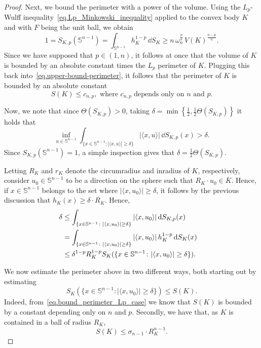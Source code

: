 \documentclass[a4paper, 10pt, twoside]{amsart}
\numberwithin{equation}{section}
\theoremstyle{plain}
\theoremstyle{definition}
\begin{document}
\begin{proof}
Next, we bound the perimeter with a power of the volume. Using the $L_p$-Wulff inequality~\eqref{eq.Lp_Minkowski_inequality} applied to the convex body $K$ and with $F$ being the unit ball, we obtain
\[
    1
    = 
    S_{K,p}(\mathbb{S}^{n-1}) 
    = 
    \int_{\mathbb{S}^{n-1}} h_K^{1-p} \, \dd S_{K} 
    \ge  
    n\,\omega_n^{\frac{p}{n}}\, {V(K)}^{\frac{n-p}{n}}.  
\]
Since we have supposed that $p \in (1,n)$, it follows at once that the volume of $K$ is bounded by an absolute constant times the $L_p$ perimeter of $K$. Plugging this back into~\eqref{eq.upper-bound-perimeter}, it follows that the perimeter of $K$ is bounded by an absolute constant 
\begin{equation}\label{eq.bound_perimeter_Lp_case}
    S(K)
    \le 
    c_{n,p},
    \text{ where $c_{n,p}$ depends only on $n$ and $p$.}
\end{equation}

Now, we note that since $\Theta(S_{K,p}) > 0$, taking  $\delta = \min\left\{\frac{1}{2},\frac{1}{2}\Theta(S_{K,p})\right\}$ it holds that 
\[
    \inf_{u \in \mathbb{S}^{n-1}} \int_{\{ x \in \mathbb{S}^{n-1} \colon |\langle x, u \rangle| \ge \delta\}} |\langle x,u\rangle| \, \dd S_{K,p}(x) > \delta. 
\]
Since $S_{K,p}(\mathbb{S}^{n-1}) = 1$, a simple inspection gives that $\delta = \frac{1}{2}\Theta(S_{K,p})$. 

Letting $R_K$ and $r_K$ denote the circumradius and inradius of $K$, respectively, consider $u_0 \in \mathbb{S}^{n-1}$ to be a direction on the sphere such that $R_K \cdot u_0 \in \overline{K}$. Hence, if $x \in \mathbb{S}^{n-1}$ belongs to the set where $|\langle x, u_0\rangle| \ge \delta$, it follows by the previous discussion that $h_K(x) \ge \delta \cdot R_K$. Hence, 
\begin{align}\label{eq.upper-R_k-per}
    \delta 
    & \le 
    \int_{
        \{x \in \mathbb{S}^{n-1} \colon |\langle x,u_0\rangle| \ge \delta\}
    } 
    |\langle x, u_0\rangle| \, 
    {\rm d} S_{K,p}(x) \cr 
    & = 
    \int_{
        \{x \in \mathbb{S}^{n-1} \colon |\langle x,u_0\rangle| \ge \delta\}
    } |\langle x,u_0\rangle| \, h_{K}^{1-p} \, 
    {\rm d} S_K(x) \cr 
    & \le \delta^{1-p} R_K^{1-p} S_K(\{x \in \mathbb{S}^{n-1} \colon |\langle x,u_0\rangle| \ge \delta\}). 
\end{align}

We now estimate the perimeter above in two different ways, both starting out by estimating 
\[
S_K(\{x \in \mathbb{S}^{n-1} \colon |\langle x,u_0\rangle| \ge \delta\}) \le S(K). 
\]
Indeed, from~\eqref{eq.bound_perimeter_Lp_case} we know that $S(K)$ is bounded by a constant depending only on $n$ and $p$. Secondly, we have that, as $K$ is contained in a ball of radius $R_K$, 
\[
S(K) \le \sigma_{n-1} \cdot R_K^{n-1}. 
\]


\end{proof}
\end{document}
